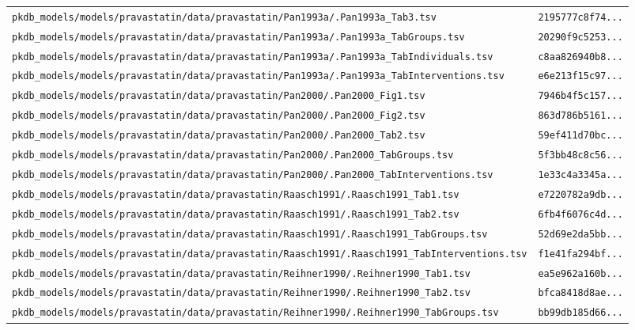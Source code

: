 \begin{longtable}{ll}
\texttt{pkdb\_models/models/pravastatin/data/pravastatin/Pan1993a/.Pan1993a\_Tab3.tsv} & \texttt{2195777c8f74...} \\
\texttt{pkdb\_models/models/pravastatin/data/pravastatin/Pan1993a/.Pan1993a\_TabGroups.tsv} & \texttt{20290f9c5253...} \\
\texttt{pkdb\_models/models/pravastatin/data/pravastatin/Pan1993a/.Pan1993a\_TabIndividuals.tsv} & \texttt{c8aa826940b8...} \\
\texttt{pkdb\_models/models/pravastatin/data/pravastatin/Pan1993a/.Pan1993a\_TabInterventions.tsv} & \texttt{e6e213f15c97...} \\
\texttt{pkdb\_models/models/pravastatin/data/pravastatin/Pan2000/.Pan2000\_Fig1.tsv} & \texttt{7946b4f5c157...} \\
\texttt{pkdb\_models/models/pravastatin/data/pravastatin/Pan2000/.Pan2000\_Fig2.tsv} & \texttt{863d786b5161...} \\
\texttt{pkdb\_models/models/pravastatin/data/pravastatin/Pan2000/.Pan2000\_Tab2.tsv} & \texttt{59ef411d70bc...} \\
\texttt{pkdb\_models/models/pravastatin/data/pravastatin/Pan2000/.Pan2000\_TabGroups.tsv} & \texttt{5f3bb48c8c56...} \\
\texttt{pkdb\_models/models/pravastatin/data/pravastatin/Pan2000/.Pan2000\_TabInterventions.tsv} & \texttt{1e33c4a3345a...} \\
\texttt{pkdb\_models/models/pravastatin/data/pravastatin/Raasch1991/.Raasch1991\_Tab1.tsv} & \texttt{e7220782a9db...} \\
\texttt{pkdb\_models/models/pravastatin/data/pravastatin/Raasch1991/.Raasch1991\_Tab2.tsv} & \texttt{6fb4f6076c4d...} \\
\texttt{pkdb\_models/models/pravastatin/data/pravastatin/Raasch1991/.Raasch1991\_TabGroups.tsv} & \texttt{52d69e2da5bb...} \\
\texttt{pkdb\_models/models/pravastatin/data/pravastatin/Raasch1991/.Raasch1991\_TabInterventions.tsv} & \texttt{f1e41fa294bf...} \\
\texttt{pkdb\_models/models/pravastatin/data/pravastatin/Reihner1990/.Reihner1990\_Tab1.tsv} & \texttt{ea5e962a160b...} \\
\texttt{pkdb\_models/models/pravastatin/data/pravastatin/Reihner1990/.Reihner1990\_Tab2.tsv} & \texttt{bfca8418d8ae...} \\
\texttt{pkdb\_models/models/pravastatin/data/pravastatin/Reihner1990/.Reihner1990\_TabGroups.tsv} & \texttt{bb99db185d66...} \\

\end{longtable}
